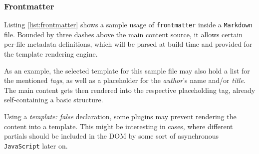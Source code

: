 \subsubsection{Frontmatter}
\label{sec:buildpipelines-frontmatter}


\label{list:frontmatter}

Listing \ref{list:frontmatter} shows a sample usage of \texttt{frontmatter} inside a \texttt{Markdown} file. Bounded by three dashes above the main content source, it allows certain per-file metadata definitions, which will be parsed at build time and provided for the template rendering engine.

As an example, the selected template for this sample file may also hold a list for the mentioned \emph{tags}, as well as a placeholder for the \emph{author}'s name and/or \emph{title}. The main content gets then rendered into the respective placeholding tag, already self-containing a basic structure.

Using a \emph{template: false} declaration, some plugins may prevent rendering the content into a template. This might be interesting in cases, where different partials should be included in the DOM by some sort of asynchronous \texttt{JavaScript} later on.

